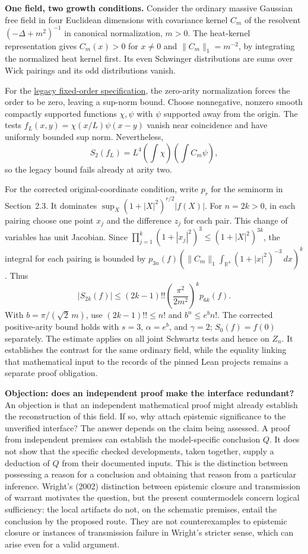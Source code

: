 \documentclass[pdflatex,sn-apa]{sn-jnl}
\begin{document}
\noindent\textbf{One field, two growth conditions.}
Consider the ordinary massive Gaussian free field in four Euclidean dimensions with covariance kernel \(C_m\) of the resolvent \((-\Delta+m^2)^{-1}\) in canonical normalization, \(m>0\). The heat-kernel representation gives \(C_m(x)>0\) for \(x\ne0\) and \(\|C_m\|_1=m^{-2}\), by integrating the normalized heat kernel first. Its even Schwinger distributions are sums over Wick pairings and its odd distributions vanish.

For the \href{https://github.com/xiyin137/OSreconstruction/blob/cf0904e34a7c146a9f312f601e3707dca4a87697/os-reconstruction/README.md#inhabitants}{legacy fixed-order specification}, the zero-arity normalization forces the order to be zero, leaving a sup-norm bound. Choose nonnegative, nonzero smooth compactly supported functions \(\chi,\psi\) with \(\psi\) supported away from the origin. The tests \(f_L(x,y)=\chi(x/L)\psi(x-y)\) vanish near coincidence and have uniformly bounded sup norm. Nevertheless,
\[
S_2(f_L)=L^4\left(\int\chi\right)\left(\int C_m\psi\right),
\]
so the legacy bound fails already at arity two.

For the corrected original-coordinate condition, write \(p_r\) for the seminorm in Section~2.3. It dominates \(\sup_X(1+|X|^2)^{r/2}|f(X)|\). For \(n=2k>0\), in each pairing choose one point \(x_j\) and the difference \(z_j\) for each pair. This change of variables has unit Jacobian. Since \(\prod_{j=1}^k(1+|x_j|^2)^3\le(1+|X|^2)^{3k}\), the integral for each pairing is bounded by \(p_{3n}(f)(\|C_m\|_1\int_{\mathbb R^4}(1+|x|^2)^{-3}\,dx)^k\). Thus
\[
|S_{2k}(f)|\le (2k-1)!!\left(\frac{\pi^2}{2m^2}\right)^k p_{6k}(f).
\]
With \(b=\pi/(\sqrt{2}\,m)\), use \((2k-1)!!\le n!\) and \(b^n\le e^b n!\). The corrected positive-arity bound holds with \(s=3\), \(\alpha=e^b\), and \(\gamma=2\); \(S_0(f)=f(0)\) separately. The estimate applies on all joint Schwartz tests and hence on \(Z_n\). It establishes the contrast for the same ordinary field, while the equality linking that mathematical input to the records of the pinned Lean projects remains a separate proof obligation.

\noindent\textbf{Objection: does an independent proof make the interface redundant?}
An objection is that an independent mathematical proof might already establish the reconstruction of this field. If so, why attach epistemic significance to the unverified interface? The answer depends on the claim being assessed. A proof from independent premises can establish the model-specific conclusion \(Q\). It does not show that the specific checked developments, taken together, supply a deduction of \(Q\) from their documented inputs. This is the distinction between possessing a reason for a conclusion and obtaining that reason from a particular inference. Wright's (2002) distinction between epistemic closure and transmission of warrant motivates the question, but the present countermodels concern logical sufficiency: the local artifacts do not, on the schematic premises, entail the conclusion by the proposed route. They are not counterexamples to epistemic closure or instances of transmission failure in Wright's stricter sense, which can arise even for a valid argument.
\end{document}
